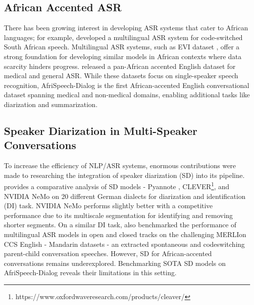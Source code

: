 \subsection{African Accented ASR}
There has been growing interest in developing ASR systems that cater to African languages; for example, \citet{yilmaz2018building} developed a multilingual ASR system for code-switched South African speech. 
Multilingual ASR systems, such as EVI dataset \cite{spithourakis2022evi}, offer a strong foundation for developing similar models in African contexts where data scarcity hinders progress. \citet{olatunji2023afrispeech} released a pan-African accented English dataset for medical and general ASR. While these datasets focus on single-speaker speech recognition, AfriSpeech-Dialog is the first African-accented English conversational dataset spanning medical and non-medical domains, enabling additional tasks like diarization and summarization.


\subsection{Speaker Diarization in Multi-Speaker Conversations}
To increase the efficiency of NLP/ASR systems, enormous contributions were made to researching the integration of speaker diarization (SD) into its pipeline. \citet{serikov2024proceedings} provides a comparative analysis of SD models - Pyannote \cite{bredin2020pyannote}, CLEVER\footnote{https://www.oxfordwaveresearch.com/products/cleaver/}, and NVIDIA NeMo \cite{harper2019nemo} on 20 different German dialects for diarization and identification (DI) task. NVIDIA NeMo performs slightly better with a competitive performance due to its multiscale segmentation for identifying and removing shorter segments. On a similar DI task, \cite{chua2023merlion} also benchmarked the performance of multilingual ASR models in open and closed tracks on the challenging MERLIon CCS English - Mandarin datasets - an extracted spontaneous and codeswitching parent-child conversation speeches. However, SD for African-accented conversations remains underexplored. Benchmarking SOTA SD models on AfriSpeech-Dialog reveals their limitations in this setting.